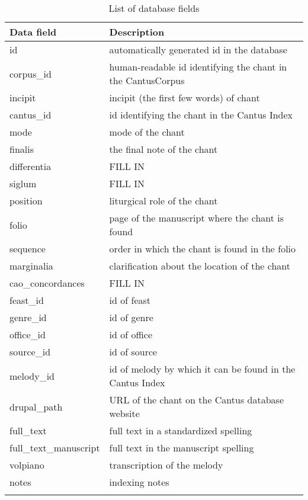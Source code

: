 \begin{longtable}{| p{} | p{} |} 

 \hline
 Data field & Description \\
 \hline
 id & automatically generated id in the database \\ \hline
 corpus\_id & human-readable id identifying the chant in the CantusCorpus \\ \hline
 incipit & incipit (the first few words) of chant \\ \hline
 cantus\_id & id identifying the chant in the Cantus Index \\ \hline
 mode & mode of the chant \\ \hline
 finalis & the final note of the chant \\ \hline
 differentia & FILL IN \\ \hline
 siglum & FILL IN \\ \hline
 position & liturgical role of the chant \\ \hline
 folio & page of the manuscript where the chant is found \\ \hline
 sequence & order in which the chant is found in the folio \\ \hline
 marginalia & clarification about the location of the chant \\ \hline
 cao\_concordances & FILL IN \\ \hline
 feast\_id & id of feast \\ \hline
 genre\_id & id of genre \\ \hline
 office\_id & id of office \\ \hline
 source\_id & id of source \\ \hline
 melody\_id & id of melody by which it can be found in the Cantus Index \\ \hline
 drupal\_path & URL of the chant on the Cantus database website \\ \hline
 full\_text & full text in a standardized spelling \\ \hline
 full\_text\_manuscript & full text in the manuscript spelling \\ \hline
 volpiano & transcription of the melody \\ \hline
 notes & indexing notes \\
 \hline

\caption{List of database fields}
\end{longtable}

